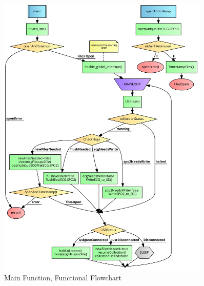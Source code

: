 \begin{figure}
	\begin{center}
		\includegraphics[scale=1,width=0.9\textwidth]{Images/FlowChartMain.pdf} 
		\caption{Main Function, Functional Flowchart}
		\label{fig:flowchart_main}
	\end{center}
\end{figure}

